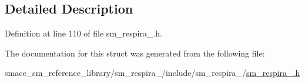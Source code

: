\subsection{Detailed Description}


Definition at line 110 of file sm\+\_\+respira\+\_.\+h.



The documentation for this struct was generated from the following file\+:\begin{DoxyCompactItemize}
\item 
smacc\+\_\+sm\+\_\+reference\+\_\+library/sm\+\_\+respira\+\_/include/sm\+\_\+respira\+\_/\hyperlink{sm__respira__1_8h}{sm\+\_\+respira\+\_.\+h}\end{DoxyCompactItemize}
